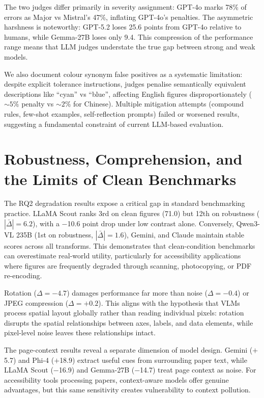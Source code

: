 The two judges differ primarily in severity assignment: GPT-4o marks 78\% of errors as Major vs Mistral's 47\%, inflating GPT-4o's penalties.
The asymmetric harshness is noteworthy: GPT-5.2 loses 25.6 points from GPT-4o relative to humans, while Gemma-27B loses only 9.4.
This compression of the performance range means that LLM judges understate the true gap between strong and weak models.

We also document colour synonym false positives as a systematic limitation: despite explicit tolerance instructions, judges penalise semantically equivalent descriptions like ``cyan'' vs ``blue'', affecting English figures disproportionately (${\sim}5\%$ penalty vs ${\sim}2\%$ for Chinese).
Multiple mitigation attempts (compound rules, few-shot examples, self-reflection prompts) failed or worsened results, suggesting a fundamental constraint of current LLM-based evaluation.

\section{Robustness, Comprehension, and the Limits of Clean Benchmarks}\label{sec:disc-robustness}

The RQ2 degradation results expose a critical gap in standard benchmarking practice.
LLaMA Scout ranks 3rd on clean figures (71.0) but 12th on robustness ($|\bar{\Delta}|{=}6.2$), with a $-$10.6 point drop under low contrast alone.
Conversely, Qwen3-VL 235B (1st on robustness, $|\bar{\Delta}|{=}1.6$), Gemini, and Claude maintain stable scores across all transforms.
This demonstrates that clean-condition benchmarks can overestimate real-world utility, particularly for accessibility applications where figures are frequently degraded through scanning, photocopying, or PDF re-encoding.

Rotation ($\Delta{=}{-}4.7$) damages performance far more than noise ($\Delta{=}{-}0.4$) or JPEG compression ($\Delta{=}{+}0.2$).
This aligns with the hypothesis that VLMs process spatial layout globally rather than reading individual pixels: rotation disrupts the spatial relationships between axes, labels, and data elements, while pixel-level noise leaves these relationships intact.

The page-context results reveal a separate dimension of model design.
Gemini ($+$5.7) and Phi-4 ($+$18.9) extract useful cues from surrounding paper text, while LLaMA Scout ($-$16.9) and Gemma-27B ($-$14.7) treat page context as noise.
For accessibility tools processing papers, context-aware models offer genuine advantages, but this same sensitivity creates vulnerability to context pollution.

